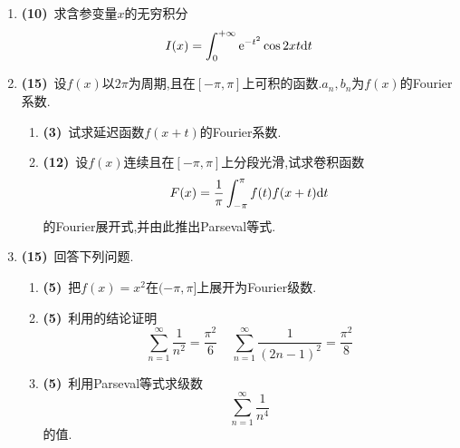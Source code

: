 \documentclass{ctexart}
\begin{document}
\begin{enumerate}[leftmargin=*,label=\textbf{\arabic*.},topsep=0pt,parsep=0pt,itemsep=0pt,partopsep=0pt]
\begin{enumerate}[label=\tbf{(\arabic*)},topsep=0pt,parsep=0pt,itemsep=0pt,partopsep=0pt]
        \end{enumerate}

    \item \textbf{(10)}\ 求含参变量$x$的无穷积分
        \[I(x)=\int_0^{+\infty}\mathrm{e}^{-t^2}\cos 2xt\mathrm{d} t\]

    \item \textbf{(15)}\ 设$f(x)$以$2\pi$为周期,且在$[-\pi,\pi]$上可积的函数.$a_n,b_n$为$f(x)$的Fourier系数.
        \begin{enumerate}[label=\tbf{(\arabic*)},topsep=0pt,parsep=0pt,itemsep=0pt,partopsep=0pt]
            \item \textbf{(3)}\ 试求延迟函数$f(x+t)$的Fourier系数.
            \item \textbf{(12)}\ 设$f(x)$连续且在$[-\pi,\pi]$上分段光滑,试求卷积函数
                \[F(x)=\dfrac{1}{\pi}\int_{-\pi}^{\pi}f(t)f(x+t)\mathrm{d} t\]
                的Fourier展开式,并由此推出Parseval等式.

        \end{enumerate}

    \item \textbf{(15)}\ 回答下列问题.
        \begin{enumerate}[label=\tbf{(\arabic*)},topsep=0pt,parsep=0pt,itemsep=0pt,partopsep=0pt]
            \item \textbf{(5)}\ 把$f(x)=x^2$在$(-\pi,\pi]$上展开为Fourier级数.
            \item \textbf{(5)}\ 利用的结论证明
                \[\sum_{n=1}^{\infty}\dfrac{1}{n^2}=\dfrac{\pi^2}{6}\ \ \ \ \ \sum_{n=1}^{\infty}\dfrac{1}{(2n-1)^2}=\dfrac{\pi^2}{8}\]
            \item \textbf{(5)}\ 利用Parseval等式求级数
                \[\sum_{n=1}^{\infty}\dfrac{1}{n^4}\]
                的值.
        \end{enumerate}

\end{enumerate}
\end{document}
